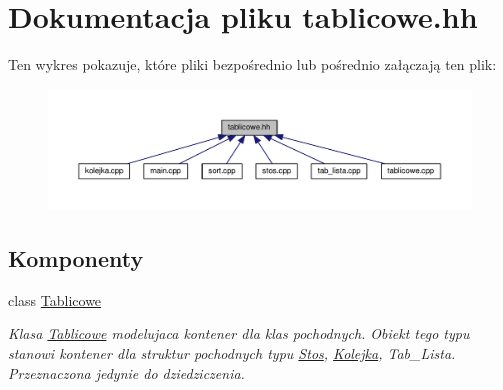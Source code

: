 \hypertarget{tablicowe_8hh}{\section{Dokumentacja pliku tablicowe.\-hh}
\label{tablicowe_8hh}
}
Ten wykres pokazuje, które pliki bezpośrednio lub pośrednio załączają ten plik\-:
\nopagebreak
\begin{figure}[H]
\begin{center}
\leavevmode
\includegraphics[width=350pt]{tablicowe_8hh__dep__incl}
\end{center}
\end{figure}
\subsection*{Komponenty}
\begin{DoxyCompactItemize}
\item 
class \hyperlink{class_tablicowe}{Tablicowe}
\begin{DoxyCompactList}\small\item\em Klasa \hyperlink{class_tablicowe}{Tablicowe} modelujaca kontener dla klas pochodnych. Obiekt tego typu stanowi kontener dla struktur pochodnych typu \hyperlink{struct_stos}{Stos}, \hyperlink{class_kolejka}{Kolejka}, Tab\-\_\-\-Lista. Przeznaczona jedynie do dziedziczenia. \end{DoxyCompactList}\end{DoxyCompactItemize}
